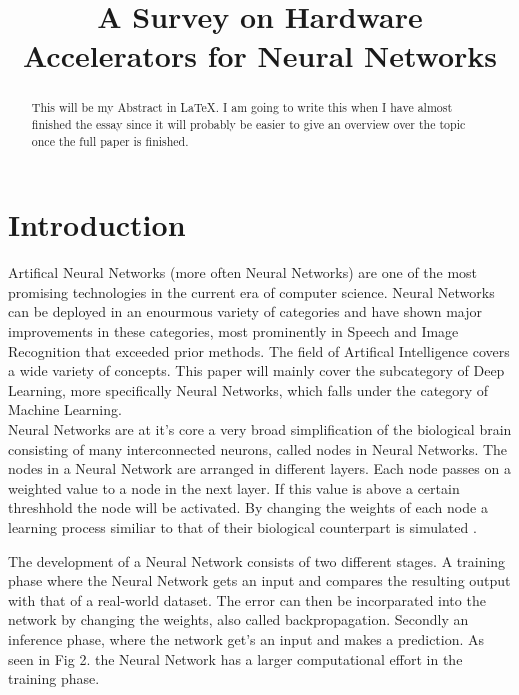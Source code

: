 \documentclass[conference]{IEEEtran}
\begin{document}
\title{A Survey on Hardware Accelerators for Neural Networks}
\author{
}

\maketitle

\begin{abstract}
This will be my Abstract in \LaTeX.
I am going to write this when I have almost finished the essay since it will probably be easier to give an overview over the topic once the full paper is finished.
\end{abstract}

\section{Introduction}
Artifical Neural Networks (more often Neural Networks) are one of the most promising technologies in the current era of computer science. Neural Networks can be deployed in an enourmous variety of categories and have shown major improvements in these categories, most prominently in Speech and Image Recognition \cite{speech_recognition1} that exceeded prior methods. The field of Artifical Intelligence covers a wide variety of concepts. This paper will mainly cover the subcategory of Deep Learning, more specifically Neural Networks, which falls under the category of Machine Learning. 
\\
Neural Networks are at it's core a very broad simplification of the biological brain consisting of many interconnected neurons, called nodes in Neural Networks. The nodes in a Neural Network are  arranged in different layers. Each node passes on a weighted value to a node in the next layer. If this value is above a certain threshhold the node will be activated. By changing the weights of each node a learning process similiar to that of their biological counterpart is simulated \cite{nn_basics}.


The development of a Neural Network consists of two different stages. A training phase where the Neural Network gets an input and compares the resulting output with that of a real-world dataset. The error can then be incorparated into the network by changing the weights, also called backpropagation. Secondly an inference phase, where the network get's an input and makes a prediction. As seen in Fig 2. the Neural Network has a larger computational effort in the training phase.
\\
\end{document}
